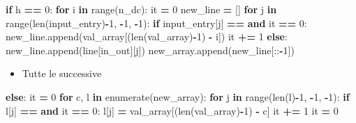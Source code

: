 \documentclass[
  italian,
]{book}
\newenvironment{Shaded}{\begin{snugshade}}{\end{snugshade}}
\newcommand{\BuiltInTok}[1]{#1}
\newcommand{\ControlFlowTok}[1]{\textcolor[rgb]{0.13,0.29,0.53}{\textbf{#1}}}
\newcommand{\DecValTok}[1]{\textcolor[rgb]{0.00,0.00,0.81}{#1}}
\newcommand{\KeywordTok}[1]{\textcolor[rgb]{0.13,0.29,0.53}{\textbf{#1}}}
\newcommand{\NormalTok}[1]{#1}
\newcommand{\OperatorTok}[1]{\textcolor[rgb]{0.81,0.36,0.00}{\textbf{#1}}}
\newcommand{\StringTok}[1]{\textcolor[rgb]{0.31,0.60,0.02}{#1}}
\providecommand{\tightlist}{%
  \setlength{\itemsep}{0pt}\setlength{\parskip}{0pt}}
\begin{document}
\begin{Shaded}
\begin{Highlighting}[]
\ControlFlowTok{if}\NormalTok{ h }\OperatorTok{==} \DecValTok{0}\NormalTok{:}
  \ControlFlowTok{for}\NormalTok{ i }\KeywordTok{in} \BuiltInTok{range}\NormalTok{(n\_dc):}
\NormalTok{    it }\OperatorTok{=} \DecValTok{0}
\NormalTok{    new\_line }\OperatorTok{=}\NormalTok{ []}
    \ControlFlowTok{for}\NormalTok{ j }\KeywordTok{in} \BuiltInTok{range}\NormalTok{(}\BuiltInTok{len}\NormalTok{(input\_entry)}\OperatorTok{{-}}\DecValTok{1}\NormalTok{, }\OperatorTok{{-}}\DecValTok{1}\NormalTok{, }\OperatorTok{{-}}\DecValTok{1}\NormalTok{):}
      \ControlFlowTok{if}\NormalTok{ input\_entry[j] }\OperatorTok{==} \StringTok{\textquotesingle{}{-}\textquotesingle{}} \KeywordTok{and}\NormalTok{ it }\OperatorTok{==} \DecValTok{0}\NormalTok{:}
\NormalTok{        new\_line.append(val\_array[(}\BuiltInTok{len}\NormalTok{(val\_array)}\OperatorTok{{-}}\DecValTok{1}\NormalTok{) }\OperatorTok{{-}}\NormalTok{ i])}
\NormalTok{        it }\OperatorTok{+=} \DecValTok{1}
      \ControlFlowTok{else}\NormalTok{:}
\NormalTok{        new\_line.append(line[in\_out][j])}
\NormalTok{    new\_array.append(new\_line[::}\OperatorTok{{-}}\DecValTok{1}\NormalTok{])}
\end{Highlighting}
\end{Shaded}

\begin{itemize}
\tightlist
\item
  Tutte le successive
\end{itemize}

\begin{Shaded}
\begin{Highlighting}[]
\ControlFlowTok{else}\NormalTok{:}
\NormalTok{  it }\OperatorTok{=} \DecValTok{0}
  \ControlFlowTok{for}\NormalTok{ c, l }\KeywordTok{in} \BuiltInTok{enumerate}\NormalTok{(new\_array):}
    \ControlFlowTok{for}\NormalTok{ j }\KeywordTok{in} \BuiltInTok{range}\NormalTok{(}\BuiltInTok{len}\NormalTok{(l)}\OperatorTok{{-}}\DecValTok{1}\NormalTok{, }\OperatorTok{{-}}\DecValTok{1}\NormalTok{, }\OperatorTok{{-}}\DecValTok{1}\NormalTok{):}
      \ControlFlowTok{if}\NormalTok{ l[j] }\OperatorTok{==} \StringTok{\textquotesingle{}{-}\textquotesingle{}} \KeywordTok{and}\NormalTok{ it }\OperatorTok{==} \DecValTok{0}\NormalTok{:}
\NormalTok{        l[j] }\OperatorTok{=}\NormalTok{ val\_array[(}\BuiltInTok{len}\NormalTok{(val\_array)}\OperatorTok{{-}}\DecValTok{1}\NormalTok{) }\OperatorTok{{-}}\NormalTok{ c]}
\NormalTok{        it }\OperatorTok{+=} \DecValTok{1}
\NormalTok{    it }\OperatorTok{=} \DecValTok{0}
\end{Highlighting}
\end{Shaded}
\end{document}
